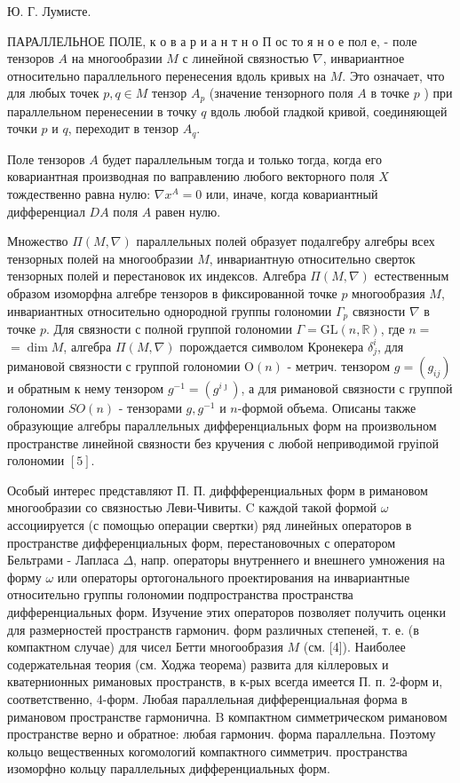 \documentclass[10pt]{article}
\begin{document}
Ю. Г. Лумисте.



ПАРАЛЛЕЛЬНОЕ ПОЛЕ, к о в а р и а н т н о П ос то я н о е пол е, - поле тензоров $A$ на многообразии $M$ с линейной связностью $\nabla$, инвариантное относительно параллельного перенесения вдоль кривых на $M$. Это означает, что для любых точек $p, q \in M$ тензор $A_{p}$ (значение тензорного поля $A$ в точке $p$ ) при параллельном перенесении в точку $q$ вдоль любой гладкой кривой, соединяющей точки $p$ и $q$, переходит в тензор $A_{q}$.



Поле тензоров $A$ будет параллельным тогда и только тогда, когда его ковариантная производная по ваправлению любого векторного поля $X$ тождественно равна нулю: $\nabla x^{A}=0$ или, иначе, когда ковариантный дифференциал $D A$ поля $A$ равен нулю.



Множество $\Pi(M, \nabla)$ параллельных полей образует подалгебру алгебры всех тензорных полей на многообразии $M$, инвариантную относительно сверток тензорных полей и перестановок их индексов. Алгебра $\Pi(M, \nabla)$ естественным образом изоморфна алгебре тензоров в фиксированной точке $p$ многообразия $M$, инвариантных относительно однородной группы голономии $\Gamma_{p}$ связности $\nabla$ в точке $p$. Для связности с полной группой голономии $\Gamma=\mathrm{GL}(n, \mathbb{R})$, где $n=$ $=\operatorname{dim} M$, алгебра $\Pi(M, \nabla)$ порождается символом Кронекера $\delta_{j}^{i}$, для римановой связности с группой голономии $\mathrm{O}(n)$ - метрич. тензором $g=\left(g_{i j}\right)$ и обратным к нему тензором $g^{-1}=\left(g^{i \jmath}\right)$, а для римановой связности с группой голономии $S O(n)$ - тензорами $g, g^{-1}$ и $n$-формой объема. Описаны также образующие алгебры параллельных дифференциальных форм на произвольном пространстве линейной связности без кручения с любой неприводимой груіпой голономии $[5]$.



Особый интерес представляют П. П. диффференциальных форм в римановом многообразии со связностью Леви-Чивиты. C каждой такой формой $\omega$ ассоциируется (с помощью операции свертки) ряд линейных операторов в пространстве дифференциальных форм, перестановочных с оператором Бельтрами - Лапласа $\Delta$, напр. операторы внутреннего и внешнего умножения на форму $\omega$ или операторы ортогонального проектирования на инвариантные относительно группы голономии подпространства пространства дифференциальных форм. Изучение этих операторов позволяет получить оценки для размерностей пространств гармонич. форм различных степеней, т. е. (в компактном случае) для чисел Бетти многообразия $M$ (см. [4]). Наиболее содержательная теория (см. Ходжа теорема) развита для кіллеровых и кватернионных римановых пространств, в к-рых всегда имеется П. п. 2-форм и, соответственно, 4-форм. Любая параллельная дифференциальная форма в римановом пространстве гармонична. $\mathrm{B}$ компактном симметрическом римановом пространстве верно и обратное: любая гармонич. форма параллельна. Поэтому кольцо вещественных когомологий компактного симметрич. пространства изоморфно кольцу параллельных дифференциальных форм.
\end{document}
